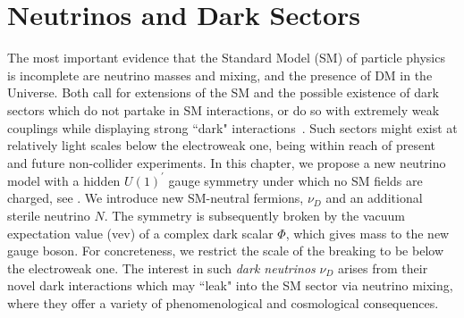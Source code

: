 \graphicspath{{}{dark_nus/}{diagrams/}}

\section{Neutrinos and Dark Sectors}

The most important evidence that the Standard Model (SM) of particle physics is incomplete are neutrino masses and mixing, and the presence of DM in the Universe. Both call for extensions of the SM and the possible existence of dark sectors which do not partake in SM interactions, or do so with extremely weak couplings while displaying strong ``dark" interactions~\cite{Boehm:2003hm,Boehm:2003ha,Alexander:2016aln}. Such sectors might exist at relatively light scales below the electroweak one, being within reach of present and future non-collider experiments. In this chapter, we propose a new neutrino model with a hidden $U(1)^\prime$ gauge symmetry under which no SM fields are charged, see  . We introduce new SM-neutral fermions, $\nu_D$ and an additional sterile neutrino $N$. The symmetry is subsequently broken by the vacuum expectation value (vev) of a complex dark scalar $\Phi$, which gives mass to the new gauge boson. For concreteness, we restrict the scale of the breaking to be below the electroweak one. The interest in such \textit{dark neutrinos} $\nu_D$ arises from their novel dark interactions which may ``leak" into the SM sector via neutrino mixing, where they offer a variety of phenomenological and cosmological consequences. 

